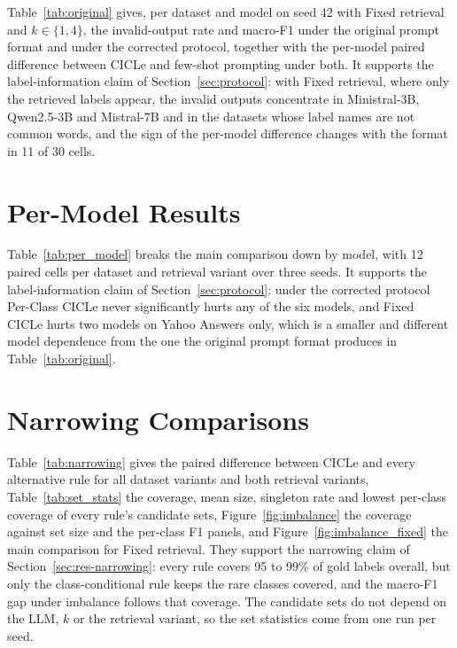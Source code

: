 Table~\ref{tab:original} gives, per dataset and model on seed 42 with Fixed retrieval and $k \in \{1, 4\}$, the invalid-output rate and macro-F1 under the original prompt format and under the corrected protocol, together with the per-model paired difference between CICLe and few-shot prompting under both. It supports the label-information claim of Section~\ref{sec:protocol}: with Fixed retrieval, where only the retrieved labels appear, the invalid outputs concentrate in Ministral-3B, Qwen2.5-3B and Mistral-7B and in the datasets whose label names are not common words, and the sign of the per-model difference changes with the format in 11 of 30 cells.



\section{Per-Model Results}
\label{app:models}

Table~\ref{tab:per_model} breaks the main comparison down by model, with 12 paired cells per dataset and retrieval variant over three seeds. It supports the label-information claim of Section~\ref{sec:protocol}: under the corrected protocol Per-Class CICLe never significantly hurts any of the six models, and Fixed CICLe hurts two models on Yahoo Answers only, which is a smaller and different model dependence from the one the original prompt format produces in Table~\ref{tab:original}.



\section{Narrowing Comparisons}
\label{app:narrowing}

Table~\ref{tab:narrowing} gives the paired difference between CICLe and every alternative rule for all dataset variants and both retrieval variants, Table~\ref{tab:set_stats} the coverage, mean size, singleton rate and lowest per-class coverage of every rule's candidate sets, Figure~\ref{fig:imbalance} the coverage against set size and the per-class F1 panels, and Figure~\ref{fig:imbalance_fixed} the main comparison for Fixed retrieval. They support the narrowing claim of Section~\ref{sec:res-narrowing}: every rule covers 95 to 99\% of gold labels overall, but only the class-conditional rule keeps the rare classes covered, and the macro-F1 gap under imbalance follows that coverage. The candidate sets do not depend on the LLM, $k$ or the retrieval variant, so the set statistics come from one run per seed.

